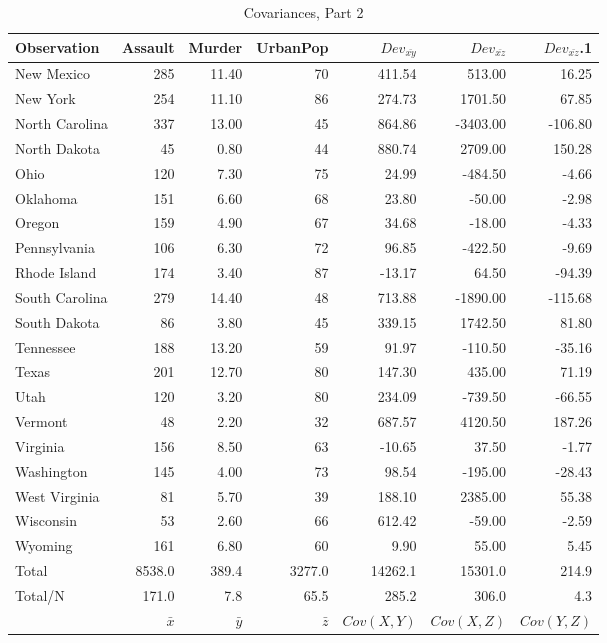 \documentclass[nohyper,justified]{tufte-handout}\usepackage[]{graphicx}\usepackage[]{color}
\newcommand{\dev}[1] {Dev_{\bar{#1}}}
\begin{document}
\newpage
\begin{table}[ht]
\centering
\begin{tabular}{lrrrrrr}
  \toprule
Observation & Assault & Murder & UrbanPop & $\dev{xy}$ & ${\dev{xz}}$ & ${\dev{xz}}$.1 \\ 
  \midrule
New Mexico & 285 & 11.40 &  70 & 411.54 & 513.00 & 16.25 \\ 
   \rowcolor[gray]{0.95}New York & 254 & 11.10 &  86 & 274.73 & 1701.50 & 67.85 \\ 
  North Carolina & 337 & 13.00 &  45 & 864.86 & -3403.00 & -106.80 \\ 
   \rowcolor[gray]{0.95}North Dakota &  45 & 0.80 &  44 & 880.74 & 2709.00 & 150.28 \\ 
  Ohio & 120 & 7.30 &  75 & 24.99 & -484.50 & -4.66 \\ 
   \rowcolor[gray]{0.95}Oklahoma & 151 & 6.60 &  68 & 23.80 & -50.00 & -2.98 \\ 
  Oregon & 159 & 4.90 &  67 & 34.68 & -18.00 & -4.33 \\ 
   \rowcolor[gray]{0.95}Pennsylvania & 106 & 6.30 &  72 & 96.85 & -422.50 & -9.69 \\ 
  Rhode Island & 174 & 3.40 &  87 & -13.17 & 64.50 & -94.39 \\ 
   \rowcolor[gray]{0.95}South Carolina & 279 & 14.40 &  48 & 713.88 & -1890.00 & -115.68 \\ 
  South Dakota &  86 & 3.80 &  45 & 339.15 & 1742.50 & 81.80 \\ 
   \rowcolor[gray]{0.95}Tennessee & 188 & 13.20 &  59 & 91.97 & -110.50 & -35.16 \\ 
  Texas & 201 & 12.70 &  80 & 147.30 & 435.00 & 71.19 \\ 
   \rowcolor[gray]{0.95}Utah & 120 & 3.20 &  80 & 234.09 & -739.50 & -66.55 \\ 
  Vermont &  48 & 2.20 &  32 & 687.57 & 4120.50 & 187.26 \\ 
   \rowcolor[gray]{0.95}Virginia & 156 & 8.50 &  63 & -10.65 & 37.50 & -1.77 \\ 
  Washington & 145 & 4.00 &  73 & 98.54 & -195.00 & -28.43 \\ 
   \rowcolor[gray]{0.95}West Virginia &  81 & 5.70 &  39 & 188.10 & 2385.00 & 55.38 \\ 
  Wisconsin &  53 & 2.60 &  66 & 612.42 & -59.00 & -2.59 \\ 
   \rowcolor[gray]{0.95}Wyoming & 161 & 6.80 &  60 & 9.90 & 55.00 & 5.45 \\ 
   \bottomrule
Total & 8538.0 & 389.4 & 3277.0 & 14262.1 & 15301.0 & 214.9 \\ 
\rowcolor[gray]{0.95}Total/N & 171.0 &  7.8 & 65.5 & 285.2 & 306.0 &  4.3 \\ 
 & $\bar{x}$ & $\bar{y}$ & $\bar{z}$ & $Cov(X,Y)$ & $Cov(X,Z)$ & $Cov(Y,Z)$   \\
\end{tabular}
\caption{Covariances, Part 2} 
\end{table}
\end{document}
